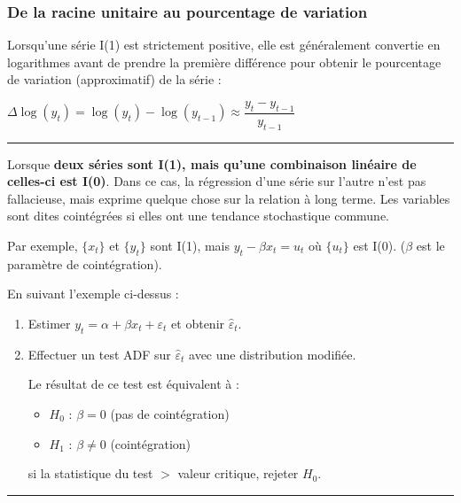 \begin{f}
\subsubsection*{De la racine unitaire au pourcentage de variation}

Lorsqu'une série I(1) est strictement positive, elle est généralement convertie en logarithmes avant de prendre la première différence pour obtenir le pourcentage de variation (approximatif) de la série :

\begin{center}
	\(\Delta \log(y_{t}) = \log(y_{t}) - \log(y_{t - 1}) \approx \dfrac{y_t - y_{t - 1}} {y_{t - 1}}\)
\end{center}

		\end{f}  \hrule

  \begin{f}[Cointégration]

Lorsque \textbf{deux séries sont I(1), mais qu'une combinaison linéaire de celles-ci est I(0)}. Dans ce cas, la régression d'une série sur l'autre n'est pas fallacieuse, mais exprime quelque chose sur la relation à long terme. Les variables sont dites cointégrées si elles ont une tendance stochastique commune.

Par exemple, \(\lbrace x_{t} \rbrace\) et \(\lbrace y_{t} \rbrace\) sont I(1), mais \(y_{t} - \beta x_{t} = u_{t}\) où \(\lbrace u_{t} \rbrace\) est I(0). (\(\beta\) est le paramètre de cointégration).

\end{f}  

\begin{f}

En suivant l'exemple ci-dessus :

\begin{enumerate}[leftmargin=*]
	\item Estimer \(y_{t} = \alpha + \beta x_{t} + \varepsilon_{t}\) et obtenir \(\hat{\varepsilon}_{t}\).
	\item Effectuer un test ADF sur \(\hat{\varepsilon}_{t}\) avec une distribution modifiée.
	
	Le résultat de ce test est équivalent à :
	
	\begin{itemize}[leftmargin=*]
		\item \(H_{0}\) : \(\beta = 0\) (pas de cointégration)
		\item \(H_{1}\) : \(\beta \neq 0\) (cointégration)
	\end{itemize}
	
	si la statistique du test \(>\) valeur critique, rejeter \(H_0\).
\end{enumerate}

\end{f}  \hrule

